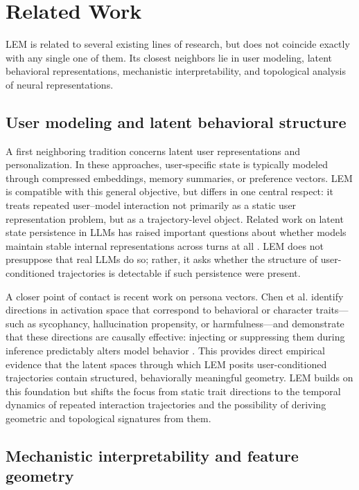 \documentclass[11pt]{article}
\begin{document}
\section{Related Work}

LEM is related to several existing lines of research, but does not coincide exactly
with any single one of them. Its closest neighbors lie in user modeling, latent
behavioral representations, mechanistic interpretability, and topological analysis
of neural representations.

\subsection{User modeling and latent behavioral structure}

A first neighboring tradition concerns latent user representations and
personalization. In these approaches, user-specific state is typically modeled
through compressed embeddings, memory summaries, or preference vectors. LEM is
compatible with this general objective, but differs in one central respect: it
treats repeated user--model interaction not primarily as a static user
representation problem, but as a trajectory-level object. Related work on latent
state persistence in LLMs has raised important questions about whether models
maintain stable internal representations across turns at all
\cite{huang2025latentstate}. LEM does not presuppose that real LLMs do so; rather,
it asks whether the structure of user-conditioned trajectories is detectable if
such persistence were present.

A closer point of contact is recent work on persona vectors. Chen et al. identify
directions in activation space that correspond to behavioral or character
traits---such as sycophancy, hallucination propensity, or harmfulness---and
demonstrate that these directions are causally effective: injecting or suppressing
them during inference predictably alters model behavior \cite{chen2025persona}. This
provides direct empirical evidence that the latent spaces through which LEM posits
user-conditioned trajectories contain structured, behaviorally meaningful geometry.
LEM builds on this foundation but shifts the focus from static trait directions to
the temporal dynamics of repeated interaction trajectories and the possibility of
deriving geometric and topological signatures from them.

\subsection{Mechanistic interpretability and feature geometry}
\end{document}
